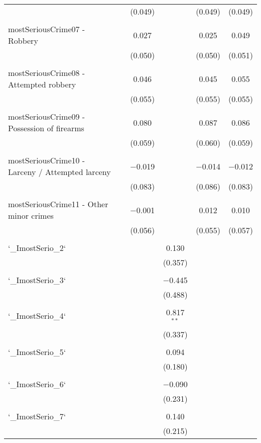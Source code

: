 \begin{table}[!htbp]
\begin{tabular}{@{\extracolsep{5pt}}lccccc}
  &  & (0.049) &  & (0.049) & (0.049) \\ 
  & & & & & \\ 
 mostSeriousCrime07 - Robbery &  & 0.027 &  & 0.025 & 0.049 \\ 
  &  & (0.050) &  & (0.050) & (0.051) \\ 
  & & & & & \\ 
 mostSeriousCrime08 - Attempted robbery &  & 0.046 &  & 0.045 & 0.055 \\ 
  &  & (0.055) &  & (0.055) & (0.055) \\ 
  & & & & & \\ 
 mostSeriousCrime09 - Possession of firearms &  & 0.080 &  & 0.087 & 0.086 \\ 
  &  & (0.059) &  & (0.060) & (0.059) \\ 
  & & & & & \\ 
 mostSeriousCrime10 - Larceny / Attempted larceny &  & $-$0.019 &  & $-$0.014 & $-$0.012 \\ 
  &  & (0.083) &  & (0.086) & (0.083) \\ 
  & & & & & \\ 
 mostSeriousCrime11 - Other minor crimes &  & $-$0.001 &  & 0.012 & 0.010 \\ 
  &  & (0.056) &  & (0.055) & (0.057) \\ 
  & & & & & \\ 
 `\_ImostSerio\_2` &  &  & 0.130 &  &  \\ 
  &  &  & (0.357) &  &  \\ 
  & & & & & \\ 
 `\_ImostSerio\_3` &  &  & $-$0.445 &  &  \\ 
  &  &  & (0.488) &  &  \\ 
  & & & & & \\ 
 `\_ImostSerio\_4` &  &  & 0.817$^{**}$ &  &  \\ 
  &  &  & (0.337) &  &  \\ 
  & & & & & \\ 
 `\_ImostSerio\_5` &  &  & 0.094 &  &  \\ 
  &  &  & (0.180) &  &  \\ 
  & & & & & \\ 
 `\_ImostSerio\_6` &  &  & $-$0.090 &  &  \\ 
  &  &  & (0.231) &  &  \\ 
  & & & & & \\ 
 `\_ImostSerio\_7` &  &  & 0.140 &  &  \\ 
  &  &  & (0.215) &  &  \\ 

\end{tabular}
\end{table}
